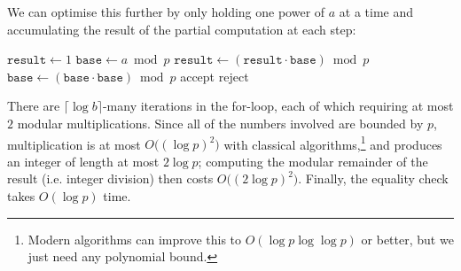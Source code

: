 \documentclass{article}
\theoremstyle{definition}
\theoremstyle{definition}
\theoremstyle{remark}
\begin{document}

We can optimise this further by only holding one power of $a$ at a time and accumulating the result of the partial computation at each step:

\begin{algorithm}[H]
\caption{Decide modular exponentiation}
\begin{algorithmic}[1]
    \State $\mathtt{result}\gets1$
    \State $\mathtt{base}\gets a\bmod p$
            \State $\mathtt{result}\gets(\mathtt{result}\cdot\mathtt{base})\bmod p$
        \EndIf
        \State $\mathtt{base}\gets(\mathtt{base}\cdot\mathtt{base})\bmod p$
    \EndFor
        \State \Return accept
    \Else
        \State \Return reject
    \EndIf
\EndProcedure
\end{algorithmic}
\end{algorithm}

There are $\lceil\log b\rceil$-many iterations in the for-loop, each of which requiring at most $2$ modular multiplications. Since all of the numbers involved are bounded by $p$, multiplication is at most $O\bigl((\log{p})^2\bigr)$ with classical algorithms,\footnote{Modern algorithms can improve this to $O(\log{p}\log\log{p})$ or better, but we just need any polynomial bound.} and produces an integer of length at most $2\log{p}$; computing the modular remainder of the result (i.e. integer division) then costs $O\bigl((2\log{p})^2\bigr)$. Finally, the equality check takes $O(\log{p})$ time.
\end{document}
